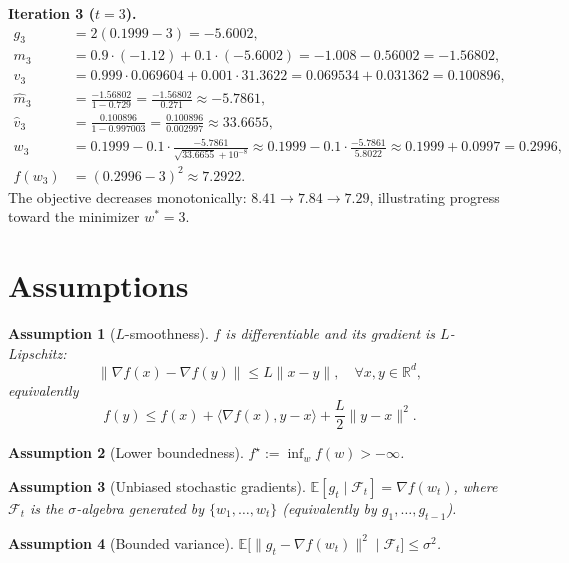 \documentclass[11pt]{article}
\newtheorem{assumption}{Assumption}
\begin{document}
\noindent\textbf{Iteration 3 ($t=3$).}
\begin{align*}
g_3 &= 2(0.1999-3) = -5.6002,\\
m_3 &= 0.9\cdot(-1.12)+0.1\cdot(-5.6002) = -1.008-0.56002 = -1.56802,\\
v_3 &= 0.999\cdot 0.069604 + 0.001\cdot 31.3622
     = 0.069534 + 0.031362 = 0.100896,\\
\hat m_3 &= \frac{-1.56802}{1-0.729} = \frac{-1.56802}{0.271}\approx -5.7861,\\
\hat v_3 &= \frac{0.100896}{1-0.997003} = \frac{0.100896}{0.002997}\approx 33.6655,\\
w_3 &= 0.1999 - 0.1\cdot\frac{-5.7861}{\sqrt{33.6655}+10^{-8}}
     \approx 0.1999 - 0.1\cdot\frac{-5.7861}{5.8022} \approx 0.1999+0.0997=0.2996,\\
f(w_3) &= (0.2996-3)^2 \approx 7.2922.
\end{align*}
The objective decreases monotonically: $8.41 \to 7.84 \to 7.29$, illustrating progress
toward the minimizer $w^*=3$.

\section*{Assumptions}
\begin{assumption}[$L$-smoothness]\label{a:smooth}
$f$ is differentiable and its gradient is $L$-Lipschitz:
\[
\|\nabla f(x)-\nabla f(y)\| \le L\|x-y\|, \quad \forall x,y\in\mathbb{R}^d,
\]
equivalently
\[
f(y) \le f(x) + \langle \nabla f(x), y-x\rangle + \frac{L}{2}\|y-x\|^2.
\]
\end{assumption}

\begin{assumption}[Lower boundedness]\label{a:lb}
$f^\star := \inf_{w} f(w) > -\infty$.
\end{assumption}

\begin{assumption}[Unbiased stochastic gradients]\label{a:unbiased}
$\mathbb{E}[g_t \mid \mathcal{F}_t] = \nabla f(w_t)$, where $\mathcal{F}_t$ is the
$\sigma$-algebra generated by $\{w_1,\dots,w_t\}$ (equivalently by $g_1,\dots,g_{t-1}$).
\end{assumption}

\begin{assumption}[Bounded variance]\label{a:var}
$\mathbb{E}\big[\|g_t-\nabla f(w_t)\|^2 \mid \mathcal{F}_t\big] \le \sigma^2$.
\end{assumption}
\end{document}
